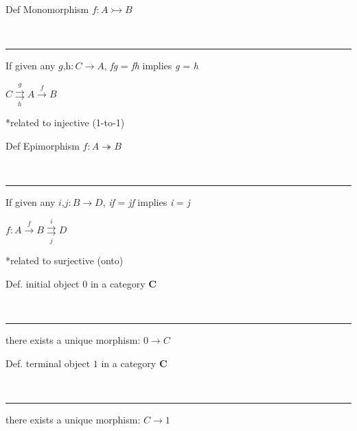 \begin{note}
  \begin{field}
    Def Monomorphism $f: A \rightarrowtail B$
  \end{field} \\
  \noindent\rule[0.5ex]{\linewidth}{1pt}
  \begin{field}
  If given any $\textit{g,h}: C \rightarrow A$, \textit{fg} = \textit{fh} implies \textit{g} = \textit{h} \\

  \begin{center}
  $C \overset{g}{\underset{h}{\rightrightarrows}} A \overset{f}{\rightarrow} B$
  \end{center}

  *related to injective (1-to-1)
  \end{field}
\end{note}

\begin{note}
  \begin{field}
  Def Epimorphism $f: A \twoheadrightarrow B$
  \end{field} \\
  \noindent\rule[0.5ex]{\linewidth}{1pt}
  \begin{field}
  If given any $\textit{i,j}: B \rightarrow D$, \textit{if} = \textit{jf} implies \textit{i} = \textit{j} \\

  \begin{center}
  $f: A \overset{f}{\rightarrow} B \overset{i}{\underset{j}{\rightrightarrows}} D$
  \end{center}

  *related to surjective (onto)
  \end{field}
\end{note}

\begin{note}
  \begin{field}
    Def. initial object $0$ in a category \textbf{C}
  \end{field} \\
  \noindent\rule[0.5ex]{\linewidth}{1pt}
  \begin{field}
    there exists a unique morphism: $0 \rightarrow C$
  \end{field}
\end{note}

\begin{note}
  \begin{field}
    Def. terminal object $1$ in a category \textbf{C}
  \end{field} \\
  \noindent\rule[0.5ex]{\linewidth}{1pt}
  \begin{field}
    there exists a unique morphism: $C \rightarrow 1$
  \end{field}
\end{note}






